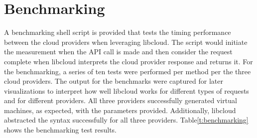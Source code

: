 \section{Benchmarking}

A benchmarking shell script is provided that tests the timing performance
between the cloud providers when leveraging libcloud. The script would initiate
the measurement when the API call is made and then consider the request
complete when libcloud interprets the cloud provider response and returns it.
For the benchmarking, a series of ten tests were performed per method per the
three cloud providers. The output for the benchmarks were captured for later
visualizations to interpret how well libcloud works for different types of
requests and for different providers. All three providers successfully
generated virtual machines, as expected, with the parameters provided.
Additionally, libcloud abstracted the syntax successfully for all three
providers. Table\ref{t:benchmarking} shows the benchmarking test results.

